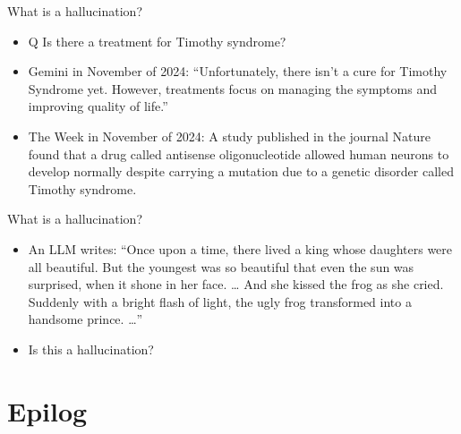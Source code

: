 \begin{vbframe}{What is a hallucination?}

\vfill


	\begin{itemize}


\item Q Is there a treatment for Timothy syndrome?
\item Gemini in November of 2024:
``Unfortunately, there isn't a cure for Timothy Syndrome
yet. However, treatments focus on managing the symptoms and
improving quality of life.''
\item The Week in November of 2024:
A study published in the journal Nature found that a drug
called antisense oligonucleotide allowed human neurons to
develop normally despite carrying a mutation due to a
genetic disorder called Timothy syndrome.
\end{itemize}


\vfill

\end{vbframe}


\begin{vbframe}{What is a hallucination?}

\vfill


	\begin{itemize}


\item An LLM writes:
``Once upon a time, there
lived a king whose daughters
were all beautiful. But the
youngest was so beautiful
that even the sun was
surprised, when it shone in
her face. \ldots
 And she kissed the frog as she cried.
       Suddenly with a bright flash of light, the ugly frog
       transformed into a handsome prince.
       \ldots''
       
\item \ques Is this a hallucination?
\end{itemize}

\vfill

\end{vbframe}






\section{Epilog}






